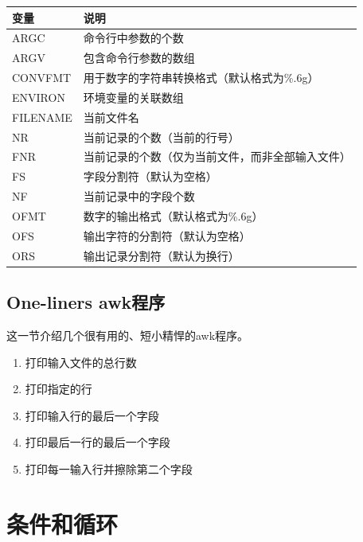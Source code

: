 \begin{table}[hbtp]
  \begin{center}
    \begin{tabular}{ll}
      \hline
      变量     & 说明 \\
      \hline
      ARGC        & 命令行中参数的个数 \\
      \hline
      ARGV        & 包含命令行参数的数组 \\
      \hline
      CONVFMT     & 用于数字的字符串转换格式（默认格式为\%.6g） \\
      \hline
      ENVIRON     & 环境变量的关联数组 \\
      \hline
      FILENAME    & 当前文件名 \\
      \hline
      NR          & 当前记录的个数（当前的行号） \\
      \hline
      FNR         &  当前记录的个数（仅为当前文件，而非全部输入文件） \\
      \hline
      FS          & 字段分割符（默认为空格） \\
      \hline
      NF          & 当前记录中的字段个数 \\
      \hline 
      OFMT        & 数字的输出格式（默认格式为\%.6g） \\
      \hline
      OFS         & 输出字符的分割符（默认为空格） \\
      \hline
      ORS         & 输出记录分割符（默认为换行） \\
      \hline
    \end{tabular}
  \end{center}
\end{table}

\subsection{One-liners awk程序}

这一节介绍几个很有用的、短小精悍的awk程序。

\begin{enumerate}
\item 打印输入文件的总行数
\item 打印指定的行
\item 打印输入行的最后一个字段
\item 打印最后一行的最后一个字段
\item 打印每一输入行并擦除第二个字段
\end{enumerate}

\section{条件和循环}

